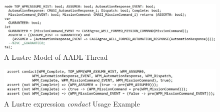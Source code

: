 \begin{figure}[ht!]
\centering
\includegraphics[width=120mm]{wpmLustre2.jpg}
\caption{A Lustre Model of AADL Thread \label{WPMlustre}}
\end{figure}

\begin{figure}[ht!]
\centering
\includegraphics[width=120mm]{lustreAsync4.jpg}
\caption{A Lustre expression \emph{condact} Usage Example\label{lustreAsync}}
\end{figure}


  